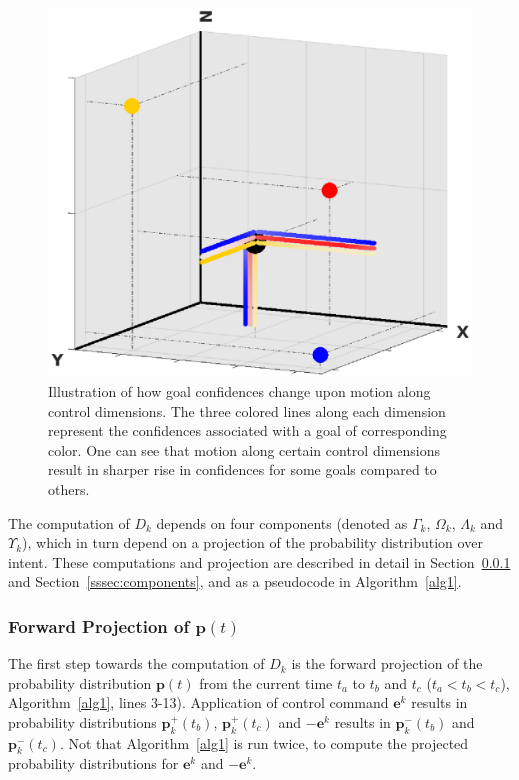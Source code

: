 \begin{figure}[h]
	\centering
	\includegraphics[width = 1\hsize]{./figures/disamb_motivation_new_origin_new_goals.eps}
	\caption{Illustration of how goal confidences change upon motion along control dimensions. The three colored lines along each dimension represent the confidences associated with a goal of corresponding color. One can see that motion along certain control dimensions result in sharper rise in confidences for some goals compared to others.}
	\label{fig:disamb_motivation}
\end{figure}
The computation of $D_k$ depends on four components (denoted as $\Gamma_k$, $\Omega_k$, $\Lambda_k$ and $\Upsilon_k$), which in turn depend on a projection of the probability distribution over intent. These computations and projection are described in detail in Section~\ref{sssec:projection} and Section~\ref{sssec:components}, and as a pseudocode in Algorithm~\ref{alg1}. 

\subsubsection{Forward Projection of $\boldsymbol{p}(t)$}\label{sssec:projection}
The first step towards the computation of $D_k$ is the forward projection of the probability distribution $\boldsymbol{p}(t)$ from the current time $t_a$ to $t_b$ and $t_c$ ($t_a < t_b < t_c$), Algorithm~\ref{alg1}, lines 3-13). Application of control command $\boldsymbol{e}^k$ results in probability distributions $\boldsymbol{p}^+_k(t_b)$, $\boldsymbol{p}^+_k(t_c)$ and $-\boldsymbol{e}^k$ results in $\boldsymbol{p}^-_k(t_b)$ and $\boldsymbol{p}^-_k(t_c)$. Not that Algorithm~\ref{alg1} is run twice, to compute the projected probability distributions for $\boldsymbol{e}^k$ and $-\boldsymbol{e}^k$.

